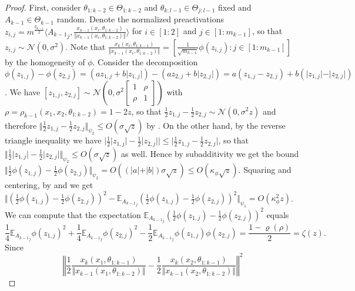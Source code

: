 \documentclass[twoside,11pt]{article}
\newcommand{\E}{\mathbb{E}}
\begin{document}
\begin{proof}
First, consider $\theta_{1:k-2} \in \Theta_{1:k-2}$ and $\theta_{k:l-1} \in \Theta_{j:l-1}$ fixed and $A_{k-1} \in \Theta_{k-1}$ random. Denote the normalized preactivations $z_{i,j} = m^{\frac{q_{k-1}}{2}} \langle {A_{k-1}}_j , \frac{ x_{k-1}(x_i, \theta_{1 : k-2}) }{ \Vert x_{k-1}(x_i, \theta_{1 : k-2}) \Vert } \rangle$ for $i \in [1:2]$ and $j \in [1:m_{k-1}]$, so that $z_{i,j} \sim \mathcal{N}(0,\sigma^2)$. Note that $\frac{x_k(x_i, \theta_{1 : k-1})}{\Vert x_{k-1}(x_i, \theta_{1 : k-2}) \Vert} = [ \frac{1}{\sqrt{m_{k-1}}} \phi(z_{i,j}) : j \in [1:m_{k-1}] ]$ by the homogeneity of $\phi$. Consider the decomposition $\phi(z_{1,j}) - \phi(z_{2,j}) = (a z_{1,j} + b \vert z_{1,j} \vert) - (a z_{2,j} + b \vert z_{2,j} \vert) = a (z_{1,j} - z_{2,j}) + b (\vert z_{1,j} \vert - \vert z_{2,j} \vert)$. We have $[z_{1,j},z_{2,j}] \sim \mathcal{N}(0, \sigma^2 \left[ \begin{smallmatrix} 1 & \rho \\ \rho & 1 \end{smallmatrix} \right])$ with $\rho = \rho_{k-1}(x_1,x_2,\theta_{1:k-2}) = 1-2z$, so that $\frac{1}{2} z_{1,j} - \frac{1}{2} z_{2,j} \sim \mathcal{N}(0,\sigma^2 z)$ and therefore $\Vert \frac{1}{2} z_{1,j} - \frac{1}{2} z_{2,j} \Vert_{\psi_2} \leq O(\sigma \sqrt{z})$ by \citet[Example~2.5.8(i)]{Vershynin2018}. On the other hand, by the reverse triangle inequality we have $\vert \frac{1}{2} \vert z_{1,j} \vert - \frac{1}{2} \vert z_{2,j} \vert \vert \leq \vert \frac{1}{2} z_{1,j} - \frac{1}{2} z_{2,j} \vert$, so that $\Vert \frac{1}{2} \vert z_{1,j} \vert - \frac{1}{2} \vert z_{2,j} \vert \Vert_{\psi_2} \leq O(\sigma \sqrt{z})$ as well. Hence by subadditivity we get the bound $\Vert \frac{1}{2} \phi(z_{1,j}) - \frac{1}{2} \phi(z_{2,j}) \Vert_{\psi_2} = O((\vert a \vert + \vert b \vert) \sigma \sqrt{z}) \leq O(\kappa_\phi \sqrt{z})$. Squaring and centering, by \citet[Lemma~2.7.6]{Vershynin2018} and \citet[Exercise~2.7.10]{Vershynin2018} we get $\Vert (\frac{1}{2} \phi(z_{1,j}) - \frac{1}{2} \phi(z_{2,j}))^2 - \E_{{A_{k-1}}_j} (\frac{1}{2} \phi(z_{1,j}) - \frac{1}{2} \phi(z_{2,j}))^2 \Vert_{\psi_1} = O(\kappa_\phi^2 z)$. We can compute that the expectation $\E_{{A_{k-1}}_j} (\frac{1}{2} \phi(z_{1,j}) - \frac{1}{2} \phi(z_{2,j}))^2$ equals
\[
\frac{1}{4} \E_{{A_{k-1}}_j} \phi(z_{1,j})^2 + \frac{1}{4} \E_{{A_{k-1}}_j} \phi(z_{2,j})^2 - \frac{1}{2} \E_{{A_{k-1}}_j} \phi(z_{1,j})\phi(z_{2,j}) = \frac{1 - \varrho(\rho)}{2} = \zeta(z).
\]
Since
\[
\left\Vert \frac{1}{2} \frac{x_k(x_1, \theta_{1 : k-1})}{\Vert x_{k-1}(x_1, \theta_{1 : k-2}) \Vert} - \frac{1}{2} \frac{x_k(x_2, \theta_{1 : k-1})}{\Vert x_{k-1}(x_2, \theta_{1 : k-2}) \Vert} \right\Vert^2 
\]
\end{proof}
\end{document}
